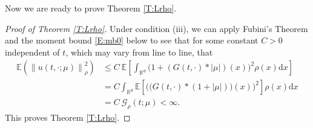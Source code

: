 \documentclass[12pt]{report}
\theoremstyle{plain}
\theoremstyle{definition}
\numberwithin{equation}{section}
\newcommand{\R}{\mathbb{R}}
\newcommand{\E}{\mathbb{E}}
\newcommand{\Norm}[1]{\left\|  #1   \right\|}
\newcommand{\ud}{\ensuremath{ \mathrm{d} }}
\begin{document}
Now we are ready to prove Theorem \ref{T:Lrho}.

\begin{proof}[Proof of Theorem \ref{T:Lrho}]
	Under condition (iii), we can apply Fubini's Theorem and the moment bound \eqref{E:mb0} below to
	see that for some constant $C>0$ independent of $t$, which may vary from line to line, that
	\begin{align*}
	\E\left(\Norm{u(t,\cdot;\mu)}_{\rho}^2\right)
	& \le C\: \E \left[\int_{\R^d}\bigg(1+(G(t,\cdot) * |\mu|)(x)\bigg)^2\rho(x)\ud x\right]                              \\
	& = C \int_{\R^d}\E \left[\bigg( \Big(G(t,\cdot) *(1+|\mu|)\Big)(x) \bigg)^2\right]\rho(x)\ud x                     \\
	& = C \:\mathcal{G}_{\rho}(t;\mu) < \infty.
	\end{align*}
	This proves Theorem \ref{T:Lrho}.
\end{proof}
\end{document}
